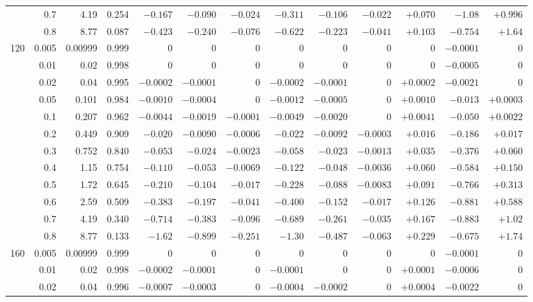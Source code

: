 \documentclass[11pt,a4paper]{article}
\begin{document}
\begin{table}[htbp]
\begin{tabular}{rrrrrrrrrrrrr}
 & 0.7 & 4.19 & 0.254 & $-0.167$ & $-0.090$ & $-0.024$ & $-0.311$ & $-0.106$ & $-0.022$ & $+0.070$ & $-1.08$ & $+0.996$ \\
 & 0.8 & 8.77 & 0.087 & $-0.423$ & $-0.240$ & $-0.076$ & $-0.622$ & $-0.223$ & $-0.041$ & $+0.103$ & $-0.754$ & $+1.64$ \\
\midrule
120 & 0.005 & 0.00999 & 0.999 & $0$ & $0$ & $0$ & $0$ & $0$ & $0$ & $0$ & $-0.0001$ & $0$ \\
 & 0.01 & 0.02 & 0.998 & $0$ & $0$ & $0$ & $0$ & $0$ & $0$ & $0$ & $-0.0005$ & $0$ \\
 & 0.02 & 0.04 & 0.995 & $-0.0002$ & $-0.0001$ & $0$ & $-0.0002$ & $-0.0001$ & $0$ & $+0.0002$ & $-0.0021$ & $0$ \\
 & 0.05 & 0.101 & 0.984 & $-0.0010$ & $-0.0004$ & $0$ & $-0.0012$ & $-0.0005$ & $0$ & $+0.0010$ & $-0.013$ & $+0.0003$ \\
 & 0.1 & 0.207 & 0.962 & $-0.0044$ & $-0.0019$ & $-0.0001$ & $-0.0049$ & $-0.0020$ & $0$ & $+0.0041$ & $-0.050$ & $+0.0022$ \\
 & 0.2 & 0.449 & 0.909 & $-0.020$ & $-0.0090$ & $-0.0006$ & $-0.022$ & $-0.0092$ & $-0.0003$ & $+0.016$ & $-0.186$ & $+0.017$ \\
 & 0.3 & 0.752 & 0.840 & $-0.053$ & $-0.024$ & $-0.0023$ & $-0.058$ & $-0.023$ & $-0.0013$ & $+0.035$ & $-0.376$ & $+0.060$ \\
 & 0.4 & 1.15 & 0.754 & $-0.110$ & $-0.053$ & $-0.0069$ & $-0.122$ & $-0.048$ & $-0.0036$ & $+0.060$ & $-0.584$ & $+0.150$ \\
 & 0.5 & 1.72 & 0.645 & $-0.210$ & $-0.104$ & $-0.017$ & $-0.228$ & $-0.088$ & $-0.0083$ & $+0.091$ & $-0.766$ & $+0.313$ \\
 & 0.6 & 2.59 & 0.509 & $-0.383$ & $-0.197$ & $-0.041$ & $-0.400$ & $-0.152$ & $-0.017$ & $+0.126$ & $-0.881$ & $+0.588$ \\
 & 0.7 & 4.19 & 0.340 & $-0.714$ & $-0.383$ & $-0.096$ & $-0.689$ & $-0.261$ & $-0.035$ & $+0.167$ & $-0.883$ & $+1.02$ \\
 & 0.8 & 8.77 & 0.133 & $-1.62$ & $-0.899$ & $-0.251$ & $-1.30$ & $-0.487$ & $-0.063$ & $+0.229$ & $-0.675$ & $+1.74$ \\
\midrule
160 & 0.005 & 0.00999 & 0.999 & $0$ & $0$ & $0$ & $0$ & $0$ & $0$ & $0$ & $-0.0001$ & $0$ \\
 & 0.01 & 0.02 & 0.998 & $-0.0002$ & $-0.0001$ & $0$ & $-0.0001$ & $0$ & $0$ & $+0.0001$ & $-0.0006$ & $0$ \\
 & 0.02 & 0.04 & 0.996 & $-0.0007$ & $-0.0003$ & $0$ & $-0.0004$ & $-0.0002$ & $0$ & $+0.0004$ & $-0.0022$ & $0$ \\

\end{tabular}
\end{table}
\end{document}
